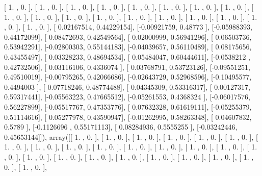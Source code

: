 \documentclass{article}
\begin{document}
       [ 1.        ,  0.        ],
       [ 1.        ,  0.        ],
       [ 1.        ,  0.        ],
       [ 1.        ,  0.        ],
       [ 1.        ,  0.        ],
       [ 1.        ,  0.        ],
       [ 1.        ,  0.        ],
       [ 1.        ,  0.        ],
       [ 1.        ,  0.        ],
       [ 1.        ,  0.        ],
       [ 1.        ,  0.        ],
       [ 1.        ,  0.        ],
       [ 1.        ,  0.        ],
       [ 1.        ,  0.        ],
       [ 1.        ,  0.        ],
       [ 1.        ,  0.        ],
       [ 1.        ,  0.        ],
       [ 1.        ,  0.        ],
       [ 0.02167514,  0.44229154],
       [-0.00921759,  0.48773   ],
       [-0.05988393,  0.44172099],
       [-0.08472693,  0.42549564],
       [-0.02000999,  0.56941296],
       [ 0.06503736,  0.53942291],
       [-0.02800303,  0.55144183],
       [-0.04039657,  0.56110489],
       [ 0.08175656,  0.43455497],
       [ 0.03328233,  0.48694534],
       [ 0.05484047,  0.60444611],
       [-0.0538212 ,  0.42732506],
       [ 0.03116106,  0.4336074 ],
       [ 0.03768791,  0.53723126],
       [-0.09551251,  0.49510019],
       [-0.00795265,  0.42066686],
       [-0.02643729,  0.52968596],
       [-0.10495577,  0.4494003 ],
       [ 0.07718246,  0.48774488],
       [-0.04345309,  0.53316317],
       [-0.00127317,  0.59317441],
       [-0.05563223,  0.47665512],
       [-0.05261553,  0.4368324 ],
       [-0.06017576,  0.56227899],
       [-0.05517767,  0.47353776],
       [ 0.07632328,  0.61619111],
       [-0.05255379,  0.51114616],
       [ 0.05277978,  0.43590947],
       [-0.01262995,  0.58263348],
       [ 0.04607832,  0.5789    ],
       [-0.1126696 ,  0.55171113],
       [ 0.08284936,  0.5555255 ],
       [-0.03242446,  0.45653144]]), array([[ 1.        ,  0.        ],
       [ 1.        ,  0.        ],
       [ 1.        ,  0.        ],
       [ 1.        ,  0.        ],
       [ 1.        ,  0.        ],
       [ 1.        ,  0.        ],
       [ 1.        ,  0.        ],
       [ 1.        ,  0.        ],
       [ 1.        ,  0.        ],
       [ 1.        ,  0.        ],
       [ 1.        ,  0.        ],
       [ 1.        ,  0.        ],
       [ 1.        ,  0.        ],
       [ 1.        ,  0.        ],
       [ 1.        ,  0.        ],
       [ 1.        ,  0.        ],
       [ 1.        ,  0.        ],
       [ 1.        ,  0.        ],
       [ 1.        ,  0.        ],
       [ 1.        ,  0.        ],
       [ 1.        ,  0.        ],
       [ 1.        ,  0.        ],
       [ 1.        ,  0.        ],
       [ 1.        ,  0.        ],
\end{document}
